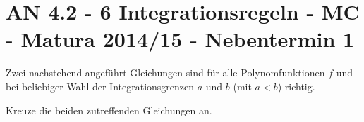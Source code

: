 \section{AN 4.2 - 6 Integrationsregeln - MC - Matura 2014/15 - Nebentermin 1}

\begin{beispiel}[AN 4.2]{1} %
Zwei nachstehend angeführt Gleichungen sind für alle Polynomfunktionen $f$ und bei beliebiger Wahl der Integrationsgrenzen $a$ und $b$ (mit $a<b$) richtig. \leer

Kreuze die beiden zutreffenden Gleichungen an. 

\end{beispiel}